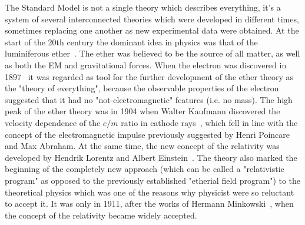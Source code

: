 The Standard Model is not a single theory which describes everything, it's a system of several interconnected theories which were developed in different times, sometimes replacing one another as new experimental data were obtained. At the start of the 20th century the dominant idea in physics was that of the luminiferous ether~\cite{lib:theory_EM1, lib:theory_EM2, lib:theory_EM3}. The ether was believed to be the source of all matter, as well as both the EM and gravitational forces. When the electron was discovered in 1897~\cite{lib:theory_electron} it was regarded as tool for the further development of the ether theory as the "theory of everything", because the observable properties of the electron suggested that it had no "not-electromagnetic" features (i.e. no mass). The high peak of the ether theory was in 1904 when Walter Kaufmann discovered the velocity dependence of the $e/m$ ratio in cathode rays~\cite{lib:theory_e_m1, lib:theory_e_m2}, which fell in line with the concept of the electromagnetic impulse previously suggested by Henri Poincare and Max Abraham. At the same time, the new concept of the relativity was developed by Hendrik Lorentz and Albert Einstein~\cite{lib:theory_relat}. The theory also marked the beginning of the completely new approach (which can be called a "relativistic program" as opposed to the previously established "etherial field program") to the theoretical physics which was one of the reasons why physicist were so reluctant to accept it. It was only in 1911, after the works of Hermann Minkowski~\cite{lib:theory_minkowski1, lib:theory_minkowski2}, when the concept of the relativity became widely accepted.

